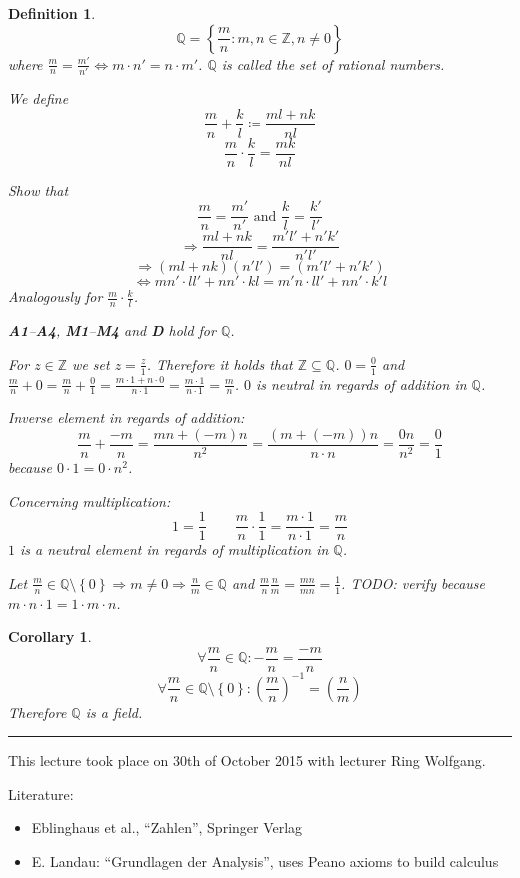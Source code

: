 \documentclass[a4paper,landscape,twocolumn]{article}
\newtheorem{defi}{Definition}
\newtheorem{cor}{Corollary}
\newcommand\set[1]{\left\{#1\right\}}
\newcommand\meta[3]{\hrule{} This #1 took place on #2 with lecturer #3.\par}
\begin{document}
\begin{defi}
  \[ \mathbb{Q} = \set{\frac mn: m,n \in \mathbb{Z}, n \neq 0} \]
  where $\frac mn = \frac{m'}{n'} \Leftrightarrow m \cdot n' = n \cdot m'$.
  $\mathbb{Q}$ is called the set of rational numbers.

  We define
  \[ \frac mn + \frac kl \coloneqq \frac{ml + nk}{nl} \]
  \[ \frac mn \cdot \frac kl = \frac{mk}{nl} \]

  Show that
  \[ \frac mn = \frac{m'}{n'} \text{ and } \frac kl = \frac{k'}{l'} \]
  \[ \Rightarrow \frac{ml + nk}{nl} = \frac{m'l' + n'k'}{n'l'} \]
  \[ \Rightarrow (ml + nk)(n' l') = (m' l' + n' k') \]
  \[ \Leftrightarrow mn' \cdot ll' + nn' \cdot kl = m'n \cdot ll' + nn' \cdot k' l \]
  Analogously for $\frac mn \cdot \frac kl$.

  \textbf{A1}--\textbf{A4}, \textbf{M1}--\textbf{M4} and \textbf{D} hold for $\mathbb{Q}$.

  For $z \in \mathbb{Z}$ we set $z = \frac z1$.
  Therefore it holds that $\mathbb{Z} \subseteq \mathbb{Q}$.
  $0 = \frac 01$ and $\frac mn + 0 = \frac mn + \frac 01 = \frac{m\cdot 1 + n\cdot 0}{n\cdot 1} = \frac{m \cdot 1}{n\cdot 1} = \frac mn$.
  $0$ is neutral in regards of addition in $\mathbb{Q}$.

  Inverse element in regards of addition:
  \[ \frac mn + \frac{-m}n = \frac{mn + (-m)n}{n^2} = \frac{(m + (-m)) n}{n \cdot n} = \frac{0n}{n^2} = \frac 01 \]
  because $0 \cdot 1 = 0 \cdot n^2$.

  Concerning multiplication:
  \[ 1 = \frac 11 \qquad \frac mn \cdot \frac 11 = \frac{m\cdot 1}{n\cdot 1} = \frac mn \]
  $1$ is a neutral element in regards of multiplication in $\mathbb{Q}$.

  Let $\frac mn \in \mathbb{Q} \setminus \set{0} \Rightarrow m \neq 0 \Rightarrow \frac nm \in \mathbb{Q}$ and $\frac mn \frac nm = \frac{mn}{mn} = \frac 11$. TODO: verify
  because $m \cdot n \cdot 1 = 1\cdot m \cdot n$.
\end{defi}

\begin{cor}
  \[ \forall \frac mn \in \mathbb{Q}: -\frac mn = \frac{-m}{n} \]
  \[ \forall \frac mn \in \mathbb{Q} \setminus \set{0}: \left(\frac mn\right)^{-1} = \left(\frac nm\right) \]
  Therefore $\mathbb{Q}$ is a field.
\end{cor}

\meta{lecture}{30th of October 2015}{Ring Wolfgang}

Literature:
\begin{itemize}
  \item Eblinghaus et al., \enquote{Zahlen}, Springer Verlag
  \item E. Landau: \enquote{Grundlagen der Analysis}, uses Peano axioms to build calculus
\end{itemize}
\end{document}
